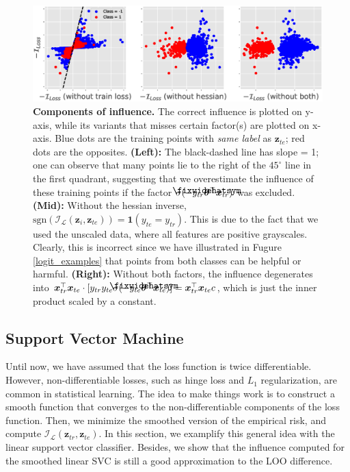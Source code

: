 \documentclass{article}
\newcommand\lowerwidehatsym{%
  \text{\smash{\raisebox{-1.3ex}{%
    $\fixwidehatsym$}}}}
\newcommand\fixwidehat[1]{%
  \mathchoice
    {\accentset{\displaystyle\lowerwidehatsym}{#1}}
    {\accentset{\textstyle\lowerwidehatsym}{#1}}
    {\accentset{\scriptstyle\lowerwidehatsym}{#1}}
    {\accentset{\scriptscriptstyle\lowerwidehatsym}{#1}}
}
\begin{document}
\setcounter{figure}{2}
\begin{figure}[H]
\vskip 0.0in
\begin{center}
\centerline{\includegraphics[width=\columnwidth]{fig-components}}
\vskip -0.1in
\caption{\textbf{Components of influence.} The correct influence is plotted on y-axis, while its variants that misses certain factor(s) are plotted on x-axis. Blue dots are the training points with \emph{same label} as $\bm{z}_{te}$; red dots are the opposites. \textbf{(Left):} The black-dashed line has slope = 1; one can observe that many points lie to the right of the $45^{\circ}$ line in the first quadrant, suggesting that we overestimate the influence of these training points if the factor $\sigma(-y_{tr}\fixwidehat{\bm{\theta}}^{\top}\bm{x}_{tr})$ was excluded. \textbf{(Mid):} Without the hessian inverse, $\text{sgn}(\mathcal{I}_{\mathcal{L}}(\bm{z}_{i}, \bm{z}_{te})) = \bm{1} (y_{te}=y_{tr})$. This is due to the fact that we used the unscaled data, where all features are positive grayscales. Clearly, this is incorrect since we have illustrated in Fugure \ref{logit_examples} that points from both classes can be helpful or harmful. \textbf{(Right):} Without both factors, the influence degenerates into $\bm{x}_{tr}^{\top} \bm{x}_{te}\cdot [y_{tr}y_{te}\sigma(-y_{te}\fixwidehat{\bm{\theta}}^{\top}\bm{x}_{te})] = \bm{x}_{tr}^{\top} \bm{x}_{te}c$, which is just the inner product scaled by a constant. } 
\label{logit_components}
\end{center}
\vskip 0in
\end{figure}


\subsection{Support Vector Machine}
Until now, we have assumed that the loss function is twice differentiable. However, non-differentiable losses, such as hinge loss and $L_1$ regularization, are common in statistical learning. The idea to make things work is to construct a smooth function that converges to the non-differentiable components of the loss function. Then, we minimize the smoothed version of the empirical risk, and compute $\mathcal{I}_{\mathcal{L}}(\bm{z}_{tr}, \bm{z}_{te})$. In this section, we examplify this general idea with the linear support vector classifier. Besides, we show that the influence computed for the smoothed linear SVC is still a good approximation to the LOO difference.
\end{document}
